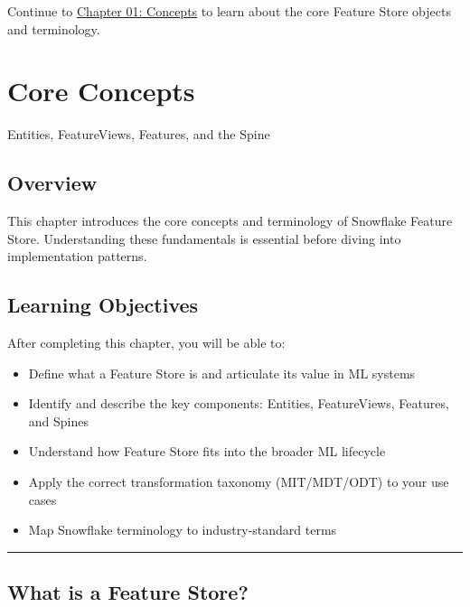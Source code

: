 \documentclass[
  letterpaper,
  DIV=11,
  numbers=noendperiod]{scrreprt}
\providecommand{\tightlist}{%
  \setlength{\itemsep}{0pt}\setlength{\parskip}{0pt}}\usepackage{longtable,booktabs,array}
\begin{document}
Continue to \protect\hyperlink{core-concepts}{Chapter 01: Concepts} to
learn about the core Feature Store objects and terminology.

\hypertarget{core-concepts}{%
\chapter{Core Concepts}\label{core-concepts}}

Entities, FeatureViews, Features, and the Spine

\hfill\break

\hypertarget{overview-1}{%
\section{Overview}\label{overview-1}}

This chapter introduces the core concepts and terminology of Snowflake
Feature Store. Understanding these fundamentals is essential before
diving into implementation patterns.

\hypertarget{learning-objectives}{%
\section{Learning Objectives}\label{learning-objectives}}

After completing this chapter, you will be able to:

\begin{itemize}
\tightlist
\item
  Define what a Feature Store is and articulate its value in ML systems
\item
  Identify and describe the key components: Entities, FeatureViews,
  Features, and Spines
\item
  Understand how Feature Store fits into the broader ML lifecycle
\item
  Apply the correct transformation taxonomy (MIT/MDT/ODT) to your use
  cases
\item
  Map Snowflake terminology to industry-standard terms
\end{itemize}

\begin{center}\rule{0.5\linewidth}{0.5pt}\end{center}

\hypertarget{what-is-a-feature-store}{%
\section{What is a Feature Store?}\label{what-is-a-feature-store}}
\end{document}
